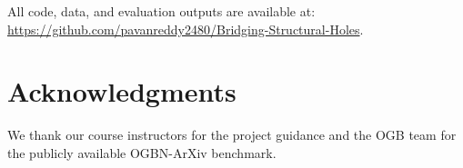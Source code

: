 \documentclass[11pt]{article}
\begin{document}
All code, data, and evaluation outputs are available at:\\
\url{https://github.com/pavanreddy2480/Bridging-Structural-Holes}.

\section*{Acknowledgments}

We thank our course instructors for the project guidance and the
OGB team for the publicly available OGBN-ArXiv benchmark.



\end{document}
